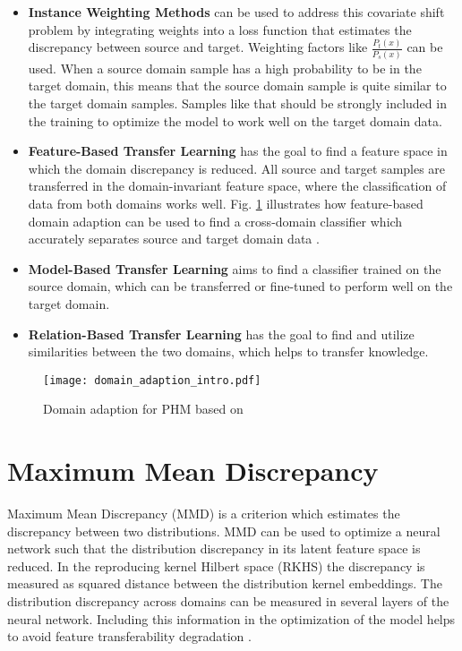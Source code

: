\begin{itemize}
\item \textbf{Instance Weighting Methods} can be used to address this covariate shift problem by integrating weights into a loss function that estimates the discrepancy between source and target. Weighting factors like $\frac{P_{t}(x)}{P_{s}(x)}$ can be used. When a source domain sample has a high probability to be in the target domain, this means that the source domain sample is quite similar to the target domain samples. Samples like that should be strongly included in the training to optimize the model to work well on the target domain data.
\item \textbf{Feature-Based Transfer Learning} has the goal to find a feature space in which the domain discrepancy is reduced. All source and target samples are transferred in the domain-invariant feature space, where the classification of data from both domains works well. Fig. \ref{fig:Domain_adaption_intro} illustrates how feature-based domain adaption can be used to find a cross-domain classifier which accurately separates source and target domain data \cite{Pandhare2021}. 
\item \textbf{Model-Based Transfer Learning} aims to find a classifier trained on the source domain, which can be transferred or fine-tuned to perform well on the target domain.
\item \textbf{Relation-Based Transfer Learning} has the goal to find and utilize similarities between the two domains, which helps to transfer knowledge. 
\end{itemize}

\begin{figure}[H]
  \centering
  \texttt{[image: domain\_adaption\_intro.pdf]}
  \caption {Domain adaption for PHM based on \cite{Pandhare2021}} \label{fig:Domain_adaption_intro}
\end{figure}


\section{Maximum Mean Discrepancy}
Maximum Mean Discrepancy (MMD) is a criterion which estimates the discrepancy between two distributions. MMD can be used to optimize a neural network such that the distribution discrepancy in its latent feature space is reduced. In the reproducing kernel Hilbert space (RKHS) the discrepancy is measured as squared distance between the distribution kernel embeddings. The distribution discrepancy across domains can be measured in several layers of the neural network. Including this information in the optimization of the model helps to avoid feature transferability degradation \cite{li2020}. 

